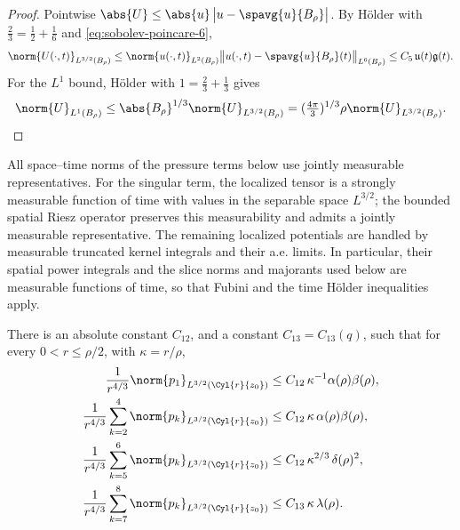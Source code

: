 \documentclass[11pt,reqno]{amsart}
\begin{document}
\begin{proof}
Pointwise $\abs{U}\le\abs{u}\,\bigl|u-\spavg{u}{B_{\rho}}\bigr|$. By H\"older
with $\tfrac23=\tfrac12+\tfrac16$ and \eqref{eq:sobolev-poincare-6},
\[
  \norm{U(\cdot,t)}_{L^{3/2}(B_{\rho})}
  \le\norm{u(\cdot,t)}_{L^{2}(B_{\rho})}
     \bigl\|u(\cdot,t)-\spavg{u}{B_{\rho}}(t)\bigr\|_{L^{6}(B_{\rho})}
  \le C_{5}\,\mathfrak{u}(t)\mathfrak{g}(t).
\]
For the $L^{1}$ bound, H\"older with $1=\tfrac23+\tfrac13$ gives
\[
\norm{U}_{L^{1}(B_{\rho})}\le\abs{B_{\rho}}^{1/3}\norm{U}_{L^{3/2}(B_{\rho})}
 =(\tfrac{4\pi}{3})^{1/3}\rho\norm{U}_{L^{3/2}(B_{\rho})}
.
\]
\end{proof}

All space--time norms of the pressure terms below use jointly measurable
representatives. For the singular term, the localized tensor is a strongly
measurable function of time with values in the separable space $L^{3/2}$;
the bounded spatial Riesz operator preserves this measurability and admits
a jointly measurable representative. The remaining localized potentials
are handled by measurable truncated kernel integrals and their a.e. limits.
In particular, their spatial power integrals and the slice norms and
majorants used below are measurable functions of time, so that Fubini and
the time H\"older inequalities apply.

\begin{lemma}\label{lem:pk-bounds}
There is an absolute constant $C_{12}$, and a constant $C_{13}=C_{13}(q)$, such
that for every $0<r\le\rho/2$, with $\kappa=r/\rho$,
\begin{align}
  \frac{1}{r^{4/3}}\norm{p_{1}}_{L^{3/2}(\Cyl{r}{z_{0}})}
    &\le C_{12}\,\kappa^{-1}\alpha(\rho)\beta(\rho),
    \label{eq:p1-bound}\\
  \frac{1}{r^{4/3}}\sum_{k=2}^{4}\norm{p_{k}}_{L^{3/2}(\Cyl{r}{z_{0}})}
    &\le C_{12}\,\kappa\,\alpha(\rho)\beta(\rho),
    \label{eq:p234-bound}\\
  \frac{1}{r^{4/3}}\sum_{k=5}^{6}\norm{p_{k}}_{L^{3/2}(\Cyl{r}{z_{0}})}
    &\le C_{12}\,\kappa^{2/3}\,\delta(\rho)^{2},
    \label{eq:p56-bound}\\
  \frac{1}{r^{4/3}}\sum_{k=7}^{8}\norm{p_{k}}_{L^{3/2}(\Cyl{r}{z_{0}})}
    &\le C_{13}\,\kappa\,\lambda(\rho).
    \label{eq:p78-bound}
\end{align}
\end{lemma}
\end{document}
